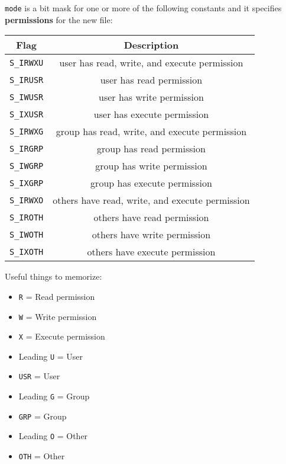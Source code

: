 \documentclass{article}
\begin{document}
\texttt{mode} is a bit mask for one or more of the following constants and it specifies \textbf{permissions} for the new file:

\begin{center}
\begin{tabular}{ |c|c| }
    \hline \textbf{Flag} & \textbf{Description} \\
    \hline
    \texttt{S\_IRWXU} & user has read, write, and execute permission \\
    \texttt{S\_IRUSR} & user has read permission \\
    \texttt{S\_IWUSR} & user has write permission \\
    \texttt{S\_IXUSR} & user has execute permission \\
    \hline
    \texttt{S\_IRWXG} & group has read, write, and execute permission \\
    \texttt{S\_IRGRP} & group has read permission \\
    \texttt{S\_IWGRP} & group has write permission \\
    \texttt{S\_IXGRP} & group has execute permission \\
    \hline
    \texttt{S\_IRWXO} & others have read, write, and execute permission \\
    \texttt{S\_IROTH} & others have read permission \\
    \texttt{S\_IWOTH} & others have write permission \\
    \texttt{S\_IXOTH} & others have execute permission \\
    \hline 
\end{tabular}
\end{center}

Useful things to memorize:

\begin{itemize}
    \item \texttt{R} = Read permission
    \item \texttt{W} = Write permission
    \item \texttt{X} = Execute permission
    \item Leading \texttt{U} = User
    \item \texttt{USR} = User
    \item Leading \texttt{G} = Group
    \item \texttt{GRP} = Group
    \item Leading \texttt{O} = Other
    \item \texttt{OTH} = Other
\end{itemize}
\end{document}
